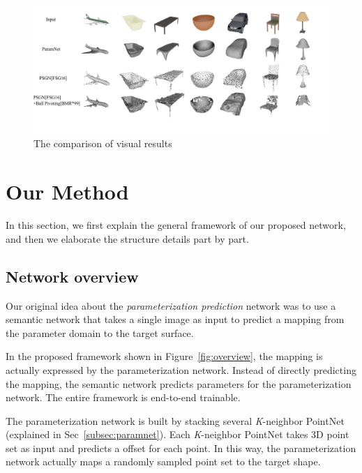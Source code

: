 \begin{figure}[htbp]
	\centering
	\includegraphics[width=\linewidth]{img/res/res}
	\caption{The comparison of visual results}
	\label{fig:res}
\end{figure}
\section{Our Method}
\label{sec:net}

In this section, we first explain the general framework of our proposed network, and then we elaborate the structure details part by part.

\subsection{Network overview}
\label{subsec:overview}
Our original idea about the \emph{parameterization prediction} network was to use a semantic network that takes a single image as input to predict a mapping from the parameter domain to the target surface. 
%

In the proposed framework shown in Figure~\ref{fig:overview}, the mapping is actually expressed by the parameterization network. 
Instead of directly predicting the mapping, the semantic network predicts parameters for the parameterization network. The entire framework is end-to-end trainable.

The parameterization network is built by stacking several \textit{K}-neighbor PointNet (explained in Sec~\ref{subsec:paramnet}). 
Each \textit{K}-neighbor PointNet takes 3D point set as input and predicts a offset for each point. 
In this way, the parameterization network actually maps a randomly sampled point set to the target shape.

